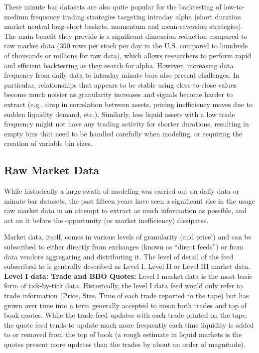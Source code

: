 These minute bar datasets are also quite popular for the backtesting of low-to-medium frequency trading strategies targeting intraday alpha (short duration market neutral long-short baskets, momentum and mean-reversion strategies). The main benefit they provide is a significant dimension reduction compared to raw market data (390 rows per stock per day in the U.S. compared to hundreds of thousands or millions for raw data), which allows researchers to perform rapid and efficient backtesting as they search for alpha. However, increasing data frequency from daily data to intraday minute bars also present challenges. In particular, relationships that appears to be stable using close-to-close values become much noisier as granularity increases and signals become harder to extract (e.g., drop in correlation between assets, pricing inefficiency moves due to sudden liquidity demand, etc.). Similarly, less liquid assets with a low trade frequency might not have any trading activity for shorter durations, resulting in empty bins that need to be handled carefully when modeling, or requiring the creation of variable bin sizes. \\


\subsection{Raw Market Data} 
While historically a large swath of modeling was carried out on daily data or minute bar datasets, the past fifteen years have seen a significant rise in the usage raw market data in an attempt to extract as much information as possible, and act on it before the opportunity (or market inefficiency) dissipates.

Market data, itself, comes in various levels of granularity (and price!) and can be subscribed to either directly from exchanges (known as ``direct feeds'') or from data vendors aggregating and distributing it. The level of detail of the feed subscribed to is generally described as Level I, Level II or Level III market data.\\


\noindent\textbf{Level I data: Trade and BBO Quotes:} Level I market data is the most basic form of tick-by-tick data. Historically, the level I data feed would only refer to trade information (Price, Size, Time of each trade reported to the tape) but has grown over time into a term generally accepted to mean both trades and top of book quotes. While the trade feed updates with each trade printed on the tape, the quote feed tends to update much more frequently each time liquidity is added to or removed from the top of book (a rough estimate in liquid markets is the quotes present more updates than the trades by about an order of magnitude). 


